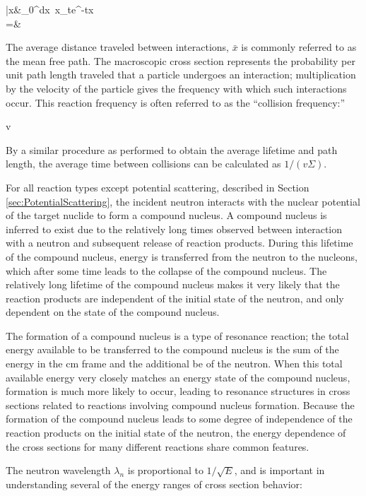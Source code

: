 \beqa
\bar{x}\equiv&\int_0^\infty dx\ x\Sigma_te^{-\Sigma tx}\\
=&\ 
\eeqa

The average distance traveled between interactions, \(\bar{x}\) is commonly referred to as the mean free path. The macroscopic cross section represents the probability per unit path length traveled that a particle undergoes an interaction; multiplication by the velocity of the particle gives the frequency with which such interactions occur. This reaction frequency is often referred to as the ``collision frequency:''

\beq
{}\equiv v\Sigma
\eeq

By a similar procedure as performed to obtain the average lifetime and path length, the average time between collisions can be calculated as \(1/(v\Sigma)\).

For all reaction types except potential scattering, described in Section \ref{sec:PotentialScattering}, the incident neutron interacts with the nuclear potential of the target nuclide to form a compound nucleus. A compound nucleus is inferred to exist due to the relatively long times observed between interaction with a neutron and subsequent release of reaction products. During this lifetime of the compound nucleus, energy is transferred from the neutron to the nucleons, which after some time leads to the collapse of the compound nucleus. The relatively long lifetime of the compound nucleus makes it very likely that the reaction products are independent of the initial state of the neutron, and only dependent on the state of the compound nucleus. 

The formation of a compound nucleus is a type of resonance reaction; the total energy available to be transferred to the compound nucleus is the sum of the energy in the \gls{cm} frame and the additional \gls{be} of the neutron. When this total available energy very closely matches an energy state of the compound nucleus, formation is much more likely to occur, leading to resonance structures in cross sections related to reactions involving compound nucleus formation. Because the formation of the compound nucleus leads to some degree of independence of the reaction products on the initial state of the neutron, the energy dependence of the cross sections for many different reactions share common features. 

The neutron wavelength \(\lambda_n\) is proportional to \(1/\sqrt{E}\), and is important in understanding several of the energy ranges of cross section behavior:

